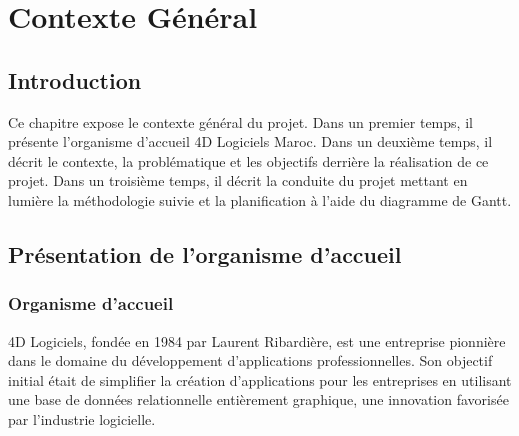     \chapter{Contexte Général}
    \pagestyle{chapterstyle}    





\newpage
\vspace{1cm}



\section{Introduction}
Ce chapitre expose le contexte général du projet. Dans un premier temps, il
présente l’organisme d’accueil 4D Logiciels Maroc. Dans un deuxième temps, il décrit le contexte,
la problématique et les objectifs derrière la réalisation de ce projet. Dans
un troisième temps, il décrit la conduite du projet mettant en lumière la méthodologie
suivie et la planification à l’aide du diagramme de Gantt.
\section{Présentation de l’organisme d’accueil}
\subsection{Organisme d'accueil}

4D Logiciels, fondée en 1984 par Laurent Ribardière, est une entreprise pionnière dans
le domaine du développement d’applications professionnelles. Son objectif initial était de
simplifier la création d’applications pour les entreprises en utilisant une base de données
relationnelle entièrement graphique, une innovation favorisée par l’industrie logicielle.\cite{4d}
\newline

